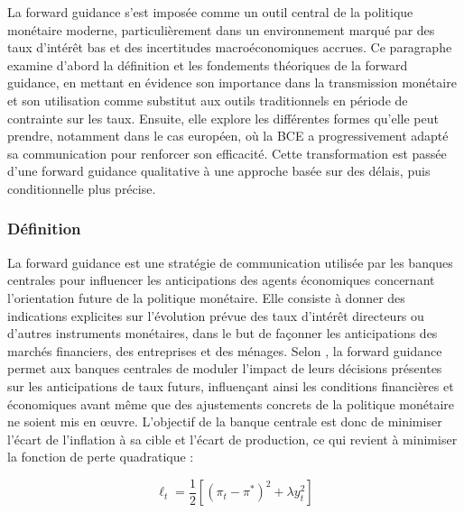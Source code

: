 La forward guidance s’est imposée comme un outil central de la politique monétaire moderne, particulièrement dans un environnement marqué par des taux d’intérêt bas et des incertitudes macroéconomiques accrues. Ce paragraphe examine d’abord la définition et les fondements théoriques de la forward guidance, en mettant en évidence son importance dans la transmission monétaire et son utilisation comme substitut aux outils traditionnels en période de contrainte sur les taux. Ensuite, elle explore les différentes formes qu’elle peut prendre, notamment dans le cas européen, où la BCE a progressivement adapté sa communication pour renforcer son efficacité. Cette transformation est passée d'une forward guidance qualitative à une approche basée sur des délais, puis conditionnelle plus précise.

\subsubsection{Définition}

La forward guidance est une stratégie de communication utilisée par les banques centrales pour influencer les anticipations des agents économiques concernant l’orientation future de la politique monétaire. Elle consiste à donner des indications explicites sur l’évolution prévue des taux d’intérêt directeurs ou d’autres instruments monétaires, dans le but de façonner les anticipations des marchés financiers, des entreprises et des ménages. Selon \citep{woodford2012}, la forward guidance permet aux banques centrales de moduler l’impact de leurs décisions présentes sur les anticipations de taux futurs, influençant ainsi les conditions financières et économiques avant même que des ajustements concrets de la politique monétaire ne soient mis en œuvre. L’objectif de la banque centrale est donc de minimiser l’écart de l’inflation à sa cible et l’écart de production, ce qui revient à minimiser la fonction de perte quadratique :

\begin{equation}
\ell_t = \frac{1}{2} \left[ (\pi_t - \pi^*)^2 + \lambda y_t^2 \right]
\end{equation}


